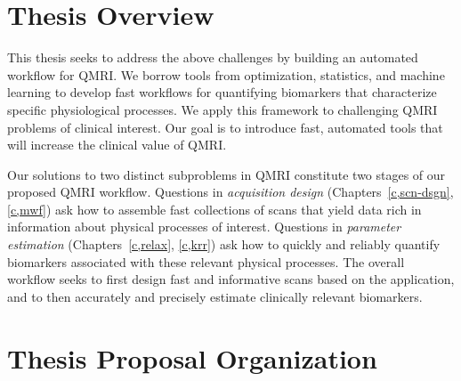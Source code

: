 \section{Thesis Overview}
\label{s,intro,over}

This thesis seeks
to address the above challenges
by building an automated workflow for QMRI.
We borrow tools
from optimization, statistics, and machine learning
to develop fast workflows
for quantifying biomarkers
that characterize specific physiological processes. 
We apply this framework
to challenging QMRI problems 
of clinical interest.
Our goal is to introduce fast, automated tools
that will increase the clinical value of QMRI.

Our solutions to two distinct subproblems in QMRI
constitute two stages of our proposed QMRI workflow.
Questions in \emph{acquisition design}
(Chapters~\ref{c,scn-dsgn}, \ref{c,mwf})
ask how to assemble 
fast collections of scans
that yield data 
rich in information 
about physical processes of interest.
Questions in \emph{parameter estimation}
(Chapters~\ref{c,relax}, \ref{c,krr})
ask how to quickly and reliably quantify biomarkers 
associated with these relevant physical processes.
The overall workflow seeks to
first design fast and informative scans 
based on the application,
and to then accurately and precisely estimate 
clinically relevant biomarkers.
 
\section{Thesis Proposal Organization}
\label{s,intro,org}

